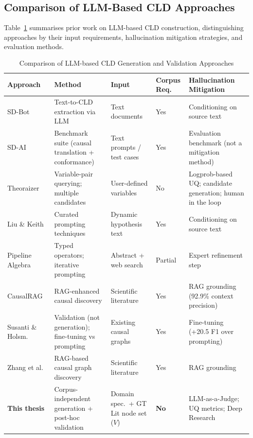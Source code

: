\subsection{Comparison of LLM-Based CLD Approaches}

Table~\ref{tab:prior_cld_work} summarises prior work on LLM-based CLD construction, distinguishing approaches by their input requirements, hallucination mitigation strategies, and evaluation methods.

\begin{table}[H]
\centering
\caption[LLM-based CLD generation approaches]{Comparison of LLM-based CLD Generation and Validation Approaches}
\label{tab:prior_cld_work}
\footnotesize
\begin{tabular}{p{2.0cm}p{2.4cm}p{1.8cm}p{1.5cm}p{3.0cm}}
\toprule
\textbf{Approach} & \textbf{Method} & \textbf{Input} & \textbf{Corpus Req.} & \textbf{Hallucination Mitigation} \\
\midrule
SD-Bot~\citep{hosseinichimeh2024textmapdynamicsbot} & Text-to-CLD extraction via LLM & Text documents & Yes & Conditioning on source text \\
\midrule
SD-AI~\citep{schoenberg2025aibuildsdmodels} & Benchmark suite (causal translation + conformance) & Text prompts / test cases & Yes & Evaluation benchmark (not a mitigation method) \\
\midrule
Theoraizer~\citep{Waaijers2024theoraizer} & Variable-pair querying; multiple candidates & User-defined variables & No & Logprob-based UQ; candidate generation; human in the loop \\
\midrule
Liu \& Keith~\citep{liu2025leveraging} & Curated prompting techniques & Dynamic hypothesis text & Yes & Conditioning on source text \\
\midrule
Pipeline Algebra~\citep{reinholtz2025pipelinealgebra} & Typed operators; iterative prompting & Abstract + web search & Partial & Expert refinement step \\
\midrule
CausalRAG~\citep{wang2025causalrag} & RAG-enhanced causal discovery & Scientific literature & Yes & RAG grounding (92.9\% context precision) \\
\midrule
Susanti \& Holsm.~\citep{susanti2024prompting} & Validation (not generation); fine-tuning vs prompting & Existing causal graphs & Yes & Fine-tuning (+20.5 F1 over prompting) \\
\midrule
Zhang et al.~\citep{zhang2024causal} & RAG-based causal graph discovery & Scientific literature & Yes & RAG grounding \\
\midrule
\textbf{This thesis} & Corpus-independent generation + post-hoc validation & Domain spec.\ + GT Lit node set ($V$) & \textbf{No} & LLM-as-a-Judge; UQ metrics; Deep Research \\
\bottomrule
\end{tabular}
\end{table}


